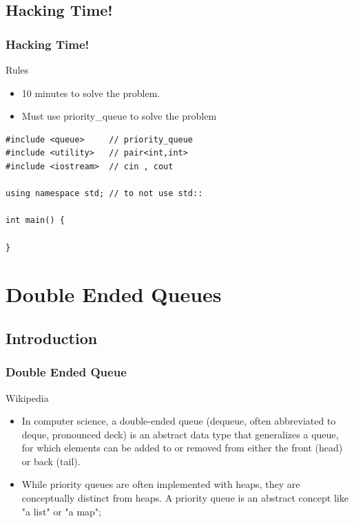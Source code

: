 \documentclass{beamer}
\begin{document}
\subsection{Hacking Time!}
\begin{frame}[fragile]
\frametitle{ Hacking Time! }
\begin{block}{Rules}
	\begin{itemize}
		\item 10 minutes to solve the problem.
		\item Must use priority\_queue to solve the problem 
	\end{itemize}
\end{block}
\begin{example}[ Link:  ]
\begin{lstlisting}
#include <queue>     // priority_queue
#include <utility>   // pair<int,int>
#include <iostream>  // cin , cout 

using namespace std; // to not use std::

int main() {
   
}
\end{lstlisting}
\end{example}
\end{frame}
\section{Double Ended Queues} 
\subsection{Introduction}
\begin{frame}
\frametitle{Double Ended Queue}
\begin{block}{Wikipedia}
\begin{itemize}
\item In computer science, a double-ended queue (dequeue, often abbreviated to deque, pronounced deck) is an abstract data type that generalizes a queue, for which elements can be added to or removed from either the front (head) or back (tail). 
\\
\item While priority queues are often implemented with heaps, they are conceptually distinct from heaps. A priority queue is an abstract concept like "a list" or "a map";
\end{itemize}
\end{block}
\end{frame}
\end{document}
